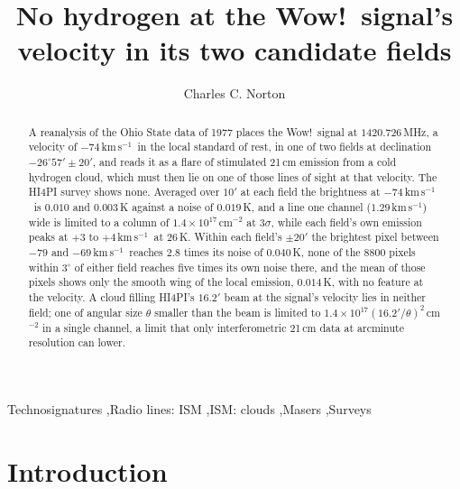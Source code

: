 \documentclass[3p,11pt]{elsarticle}
\newcommand{\kms}{km\,s$^{-1}$}
\begin{document}
\begin{frontmatter}

\title{No hydrogen at the Wow!\ signal's velocity in its two candidate fields}

\author{Charles C. Norton}

\begin{abstract}
A reanalysis of the Ohio State data of 1977 places the Wow!\ signal at
$1420.726$\,MHz, a velocity of $-74$\,\kms\ in the local standard of rest, in one of two
fields at declination $-26^\circ57'\pm20'$, and reads it as a flare of stimulated 21\,cm
emission from a cold hydrogen cloud, which must then lie on one of those lines of sight
at that velocity. The HI4PI survey shows none. Averaged over $10'$ at each field the
brightness at $-74$\,\kms\ is $0.010$ and $0.003$\,K against a noise of $0.019$\,K, and
a line one channel ($1.29$\,\kms) wide is limited to a column of
$1.4\times10^{17}$\,cm$^{-2}$ at $3\sigma$, while each field's own emission peaks at
$+3$ to $+4$\,\kms\ at $26$\,K. Within each field's $\pm20'$ the brightest pixel between
$-79$ and $-69$\,\kms\ reaches $2.8$ times its noise of $0.040$\,K, none of the $8800$
pixels within $3^\circ$ of either field reaches five times its own noise there, and the
mean of those pixels shows only the smooth wing of the local emission, $0.014$\,K, with
no feature at the velocity. A cloud filling HI4PI's $16.2'$ beam at the signal's
velocity lies in neither field; one of angular size $\theta$ smaller than the beam is
limited to $1.4\times10^{17}(16.2'/\theta)^2$\,cm$^{-2}$ in a single channel, a limit
that only interferometric 21\,cm data at arcminute resolution can lower.
\end{abstract}

\begin{keyword}
Technosignatures \sep Radio lines: ISM \sep ISM: clouds \sep Masers \sep Surveys
\end{keyword}

\end{frontmatter}

\section{Introduction}\label{sec:intro}
\end{document}
